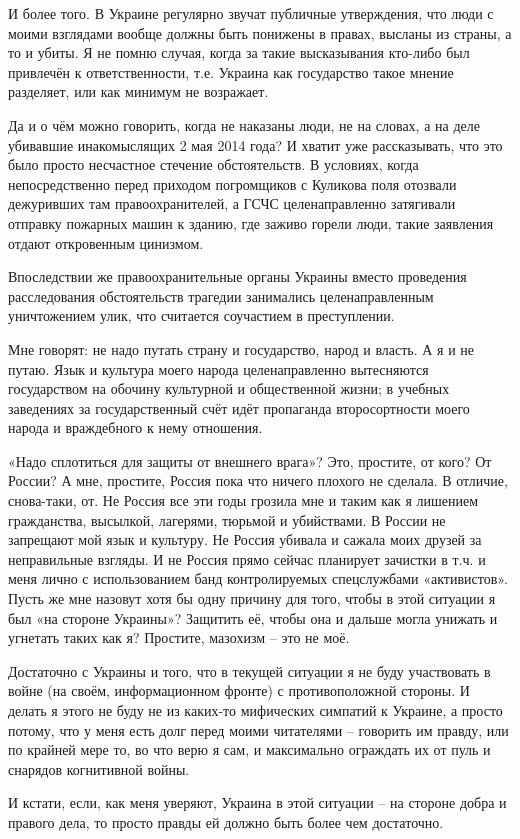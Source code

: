 И более того. В Украине регулярно звучат публичные утверждения, что люди с
моими взглядами вообще должны быть понижены в правах, высланы из страны, а то и
убиты. Я не помню случая, когда за такие высказывания кто-либо был привлечён к
ответственности, т.е. Украина как государство такое мнение разделяет, или как
минимум не возражает.

Да и о чём можно говорить, когда не наказаны люди, не на словах, а на деле
убивавшие инакомыслящих 2 мая 2014 года? И хватит уже рассказывать, что это
было просто несчастное стечение обстоятельств. В условиях, когда
непосредственно перед приходом погромщиков с Куликова поля отозвали дежуривших
там правоохранителей, а ГСЧС целенаправленно затягивали отправку пожарных машин
к зданию, где заживо горели люди, такие заявления отдают откровенным цинизмом.

Впоследствии же правоохранительные органы Украины вместо проведения
расследования обстоятельств трагедии занимались целенаправленным уничтожением
улик, что считается соучастием в преступлении.

Мне говорят: не надо путать страну и государство, народ и власть. А я и не
путаю. Язык и культура моего народа целенаправленно вытесняются государством на
обочину культурной и общественной жизни; в учебных заведениях за
государственный счёт идёт пропаганда второсортности моего народа и враждебного
к нему отношения. 

«Надо сплотиться для защиты от внешнего врага»? Это, простите, от кого? От
России? А мне, простите, Россия пока что ничего плохого не сделала. В отличие,
снова-таки, от. Не Россия все эти годы грозила мне и таким как я лишением
гражданства, высылкой, лагерями, тюрьмой и убийствами. В России не запрещают
мой язык и культуру. Не Россия убивала и сажала моих друзей за неправильные
взгляды. И не Россия прямо сейчас планирует зачистки в т.ч. и меня лично с
использованием банд контролируемых спецслужбами «активистов».  Пусть же мне
назовут хотя бы одну причину для того, чтобы в этой ситуации я был «на стороне
Украины»? Защитить её, чтобы она и дальше могла унижать и угнетать таких как я?
Простите, мазохизм – это не моё.

Достаточно с Украины и того, что в текущей ситуации я не буду участвовать в
войне (на своём, информационном фронте) с противоположной стороны. И делать я
этого не буду не из каких-то мифических симпатий к Украине, а просто потому,
что у меня есть долг перед моими читателями – говорить им правду, или по
крайней мере то, во что верю я сам, и максимально ограждать их от пуль и
снарядов когнитивной войны. 

И кстати, если, как меня уверяют, Украина в этой ситуации – на стороне добра и
правого дела, то просто правды ей должно быть более чем достаточно.
